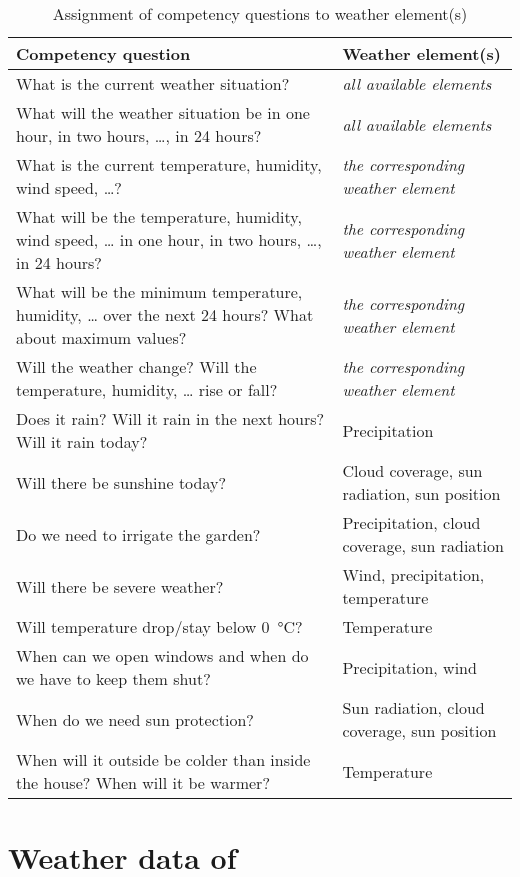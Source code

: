 \begin{table}
\centering
\begin{tabular}{|p{}|p{}|}
\hline
\textbf{Competency question} & \textbf{Weather element(s)} \\
\hline \hline
What is the current weather situation? & \emph{all available elements} \\
\hline
What will the weather situation be in one hour, in two hours, …, in 24 hours? & \emph{all available elements} \\
\hline
What is the current temperature, humidity, wind speed, …? & \emph{the corresponding weather element} \\
\hline
What will be the temperature, humidity, wind speed, … in one hour, in two hours, …, in 24 hours? & \emph{the corresponding weather element} \\
\hline
What will be the minimum temperature, humidity, … over the next 24 hours? What about maximum values? & \emph{the corresponding weather element} \\
\hline
Will the weather change? Will the temperature, humidity, … rise or fall? & \emph{the corresponding weather element} \\
\hline
Does it rain? Will it rain in the next hours? Will it rain today? & Precipitation \\
\hline
Will there be sunshine today? & Cloud coverage, sun radiation, sun position \\
\hline
Do we need to irrigate the garden? & Precipitation, cloud coverage, sun radiation \\
\hline
Will there be severe weather? & Wind, precipitation, temperature \\
\hline
Will temperature drop/stay below \SI{0}{\celsius}? & Temperature \\
\hline
When can we open windows and when do we have to keep them shut? & Precipitation, wind \\
\hline
When do we need sun protection? & Sun radiation, cloud coverage, sun position \\
\hline
When will it outside be colder than inside the house? When will it be warmer? & Temperature \\
\hline
\end{tabular}
\label{table:competency_questions}
\caption{Assignment of competency questions to weather element(s)}
\end{table}

\section{Weather data  of \yrno}
\label{sec:weather_data_yr_no}


